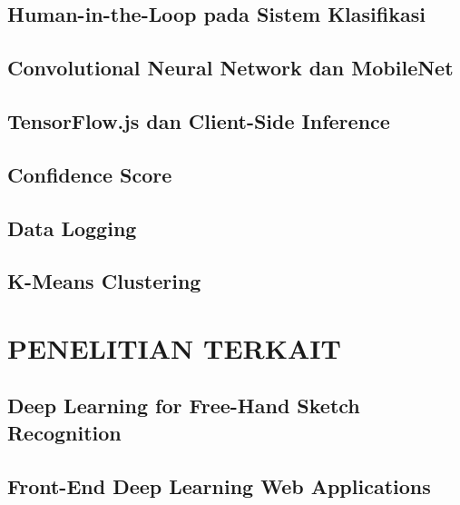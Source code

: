 \documentclass[12pt,a4paper,oneside,openany]{report}
\begin{document}
\subsection{Human-in-the-Loop pada Sistem Klasifikasi}
\label{subsec:hitl-klasifikasi}

\subsection{Convolutional Neural Network dan MobileNet}
\label{subsec:cnn-mobilenet}

\subsection{TensorFlow.js dan Client-Side Inference}
\label{subsec:tfjs}

\subsection{Confidence Score}
\label{subsec:confidence-score}

\subsection{Data Logging}
\label{subsec:data-logging}

\subsection{K-Means Clustering}
\label{subsec:kmeans}

\section{PENELITIAN TERKAIT}
\label{sec:penelitian-terkait}

\subsection{Deep Learning for Free-Hand Sketch Recognition}
\label{subsec:penelitian-1}

\subsection{Front-End Deep Learning Web Applications}
\label{subsec:penelitian-2}
\end{document}
